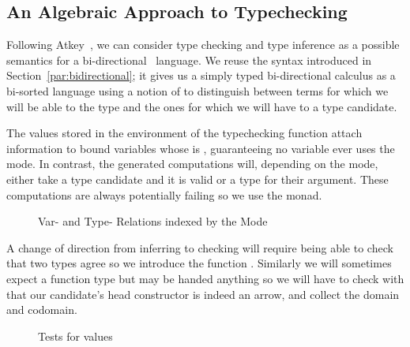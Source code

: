 \subsection{An Algebraic Approach to Typechecking}\label{section:typechecking}

Following Atkey~\citeyear{atkey2015algebraic}, we can consider type checking
and type inference as a possible semantics for a bi-directional~\cite{pierce2000local}
language. We reuse the syntax introduced in Section~\ref{par:bidirectional}; it
gives us a simply typed bi-directional calculus as a bi-sorted language using
a notion of  to distinguish between terms for which we will be able to
 the type and the ones for which we will have to  a type
candidate.

The values stored in the environment of the typechecking function attach 
information to bound variables whose  is , guaranteeing no
variable ever uses the  mode. In contrast, the generated computations
will, depending on the mode, either take a type candidate and  it is
valid or  a type for their argument. These computations are always
potentially failing so we use the  monad.

\begin{figure}[h]
\begin{minipage}{0.40\textwidth}
\end{minipage}\hfill
\begin{minipage}{0.50\textwidth}
\end{minipage}
\caption{Var- and Type- Relations indexed by the Mode}
\end{figure}

A change of direction from inferring to checking will require being able to check
that two types agree so we introduce the function . Similarly we will
sometimes expect a function type but may be handed anything so we will have to check
with  that our candidate's head constructor is indeed an arrow, and
collect the domain and codomain.

\begin{figure}[h]
\begin{minipage}{0.45\textwidth}
\end{minipage}\hfill
\begin{minipage}{0.45\textwidth}
\end{minipage}
\caption{Tests for  values}
\end{figure}

